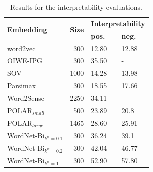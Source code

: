 \documentclass[11pt,a4paper]{article}
\begin{document}

\begin{table}
    \centering
	\begin{tabular}{lrll}
	    \hline \hline
        \multirow{2}{*}{\textbf{Embedding}} & \multirow{2}{*}{\textbf{Size}} &  \multicolumn{2}{c}{\textbf{Interpretability}}\\
                 & & \textbf{pos.} & \textbf{neg.} \\\hline \hline %
        word2vec & 300 & 12.80 & 12.88 \\
        OIWE-IPG & 300 & 35.50 & - \\
        SOV & 1000 & 14.28 & 13.98 \\
        Parsimax & 300 & 18.55 & 17.66\\
        Word2Sense & 2250 & 34.11 & -\\
        POLAR$_{small}$ & 500 & 23.89 & 20.8\\
        POLAR$_{large}$ & 1465 & 28.60 & 25.91\\
        WordNet-Bi$_{k^w = 0.1}$ & 300 & 36.24 & 39.1\\
        WordNet-Bi$_{k^w = 0.2}$ & 300 & 42.04 & 46.77\\
        WordNet-Bi$_{k^w = 1}$ & 300 & 52.90 & 57.80\\
        \hline \hline
	\end{tabular}
	\caption{ Results for the interpretability evaluations. }
	\label{tab:interp_results}
\end{table}

\end{document}
